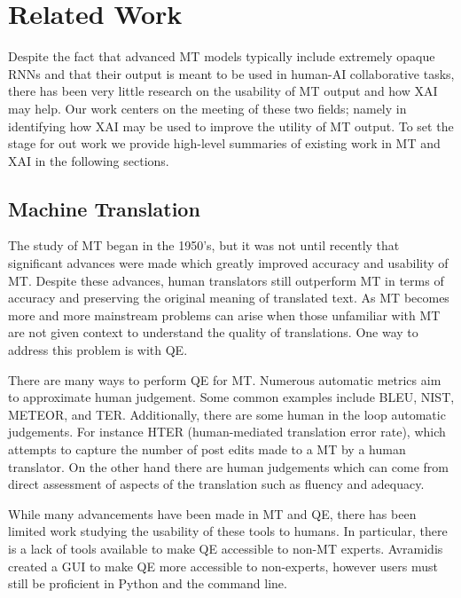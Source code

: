 \section{Related Work}

Despite the fact that advanced MT models typically include extremely opaque RNNs and that their output is meant to be used in human-AI collaborative tasks\cite{mauvcec2019machine}, there has been very little research on the usability of MT output and how XAI may help. Our work centers on the meeting of these two fields; namely in identifying how XAI may be used to improve the utility of MT output. To set the stage for out work we provide high-level summaries of existing work in MT and XAI in the following sections.  

\subsection{Machine Translation} 

The study of MT began in the 1950's, but it was not until recently that significant advances were made which greatly improved accuracy and usability of MT. Despite these advances, human translators still outperform MT in terms of accuracy and preserving the original meaning of translated text\cite{mauvcec2019machine}. As MT becomes more and more mainstream problems can arise when those unfamiliar with MT are not given context to understand the quality of translations. One way to address this problem is with QE.  

There are many ways to perform QE for MT. Numerous automatic metrics aim to approximate human judgement. Some common examples include BLEU, NIST, METEOR, and TER. Additionally, there are some human in the loop automatic judgements. For instance HTER (human-mediated translation error rate), which attempts to capture the number of post edits made to a MT by a human translator\cite{mauvcec2019machine}. On the other hand there are human judgements which can come from direct assessment of aspects of the translation such as fluency and adequacy\cite{snover2009Fluency}.           

While many advancements have been made in MT and QE, there has been limited work studying the usability of these tools to humans. In particular, there is a lack of tools available to make QE accessible to non-MT experts. Avramidis created a GUI to make QE more accessible to non-experts, however users must still be proficient in Python and the command line\cite{avramidis2017QE}.    

